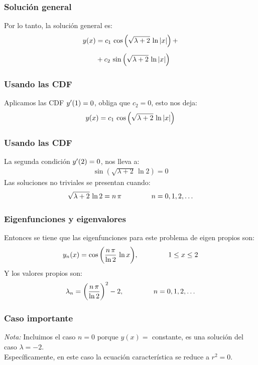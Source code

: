 \documentclass[12pt]{beamer}
\begin{document}
\begin{frame}
\frametitle{Solución general}
Por lo tanto, la solución general es:
\pause
\begin{align}
\begin{aligned}
y(x) &= c_{1} \, \cos \left( \sqrt{\lambda + 2} \, \ln \abs{x} \right) + \\[0.5em]
&+ c_{2} \, \sin \left( \sqrt{\lambda + 2} \, \ln \abs{x} \right)
\end{aligned}
\label{eq:ecuacion_04_15}
\end{align}
\end{frame}
\begin{frame}
\frametitle{Usando las CDF}
Aplicamos las CDF ${y}^{\prime}(1) = 0$, \pause obliga que $c_{2} = 0$, esto nos deja:
\pause
\begin{align*}
y(x) = c_{1} \, \cos \left( \sqrt{\lambda + 2} \, \ln \abs{x} \right)
\end{align*}
\end{frame}
\begin{frame}
\frametitle{Usando las CDF}
La segunda condición ${y}^{\prime}(2) = 0$, nos lleva a:
\pause
\begin{align*}
\sin \left( \sqrt{\lambda + 2} \, \ln 2 \right) = 0
\end{align*}
\pause
Las soluciones no triviales se presentan cuando:
\pause
\begin{align*}
\sqrt{\lambda + 2} \, \ln 2 = n \, \pi \hspace{1.5cm} n = 0, 1, 2, \ldots
\end{align*}
\end{frame}
\begin{frame}
\frametitle{Eigenfunciones y eigenvalores}
Entonces se tiene que las eigenfunciones para este problema de eigen propios son:
\pause
\begin{align*}
y_{n}(x) = \cos \bigg( \dfrac{n \, \pi}{\ln 2} \, \ln x \bigg), \hspace{1.5cm} 1 \leq x \leq 2
\end{align*}
\pause
Y los valores propios son:
\pause
\begin{align*}
\lambda_{n} = \bigg( \dfrac{n \, \pi}{\ln 2} \bigg)^{2} - 2, \hspace{1.5cm} n = 0, 1, 2, \ldots
\end{align*}
\end{frame}
\begin{frame}
\frametitle{Caso importante}
\emph{Nota:} Incluimos el caso $n = 0$ porque \break \hfill $y (x) =$ constante, es una solución del caso \break \hfill $\lambda = - 2$.
\\
\bigskip
\pause
Específicamente, en este caso la ecuación característica se reduce a $r^{2} = 0$.
\end{frame}
\end{document}
